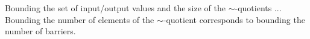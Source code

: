 Bounding the set of input/output values and the size of the $\sim$-quotients ... Bounding the number of elements of the $\sim$-quotient corresponds to bounding the number of barriers.

